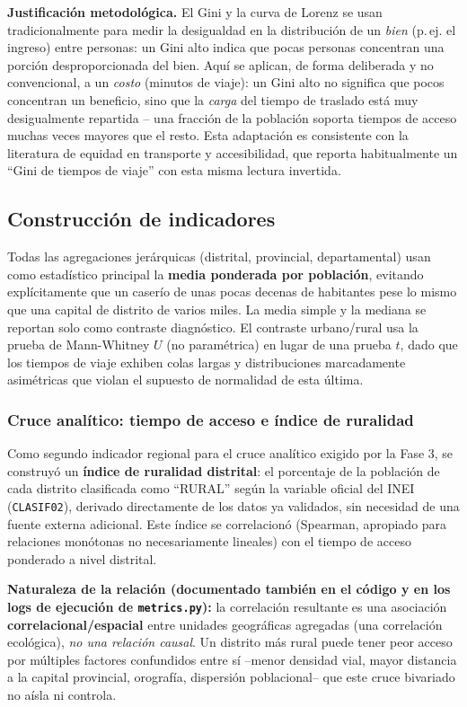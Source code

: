 \documentclass[11pt]{article}
\begin{document}
\textbf{Justificación metodológica.} El Gini y la curva de Lorenz se usan
tradicionalmente para medir la desigualdad en la distribución de un
\emph{bien} (p.\,ej. el ingreso) entre personas: un Gini alto indica que
pocas personas concentran una porción desproporcionada del bien. Aquí se
aplican, de forma deliberada y no convencional, a un \emph{costo} (minutos
de viaje): un Gini alto no significa que pocos concentran un beneficio,
sino que la \emph{carga} del tiempo de traslado está muy desigualmente
repartida -- una fracción de la población soporta tiempos de acceso muchas
veces mayores que el resto. Esta adaptación es consistente con la
literatura de equidad en transporte y accesibilidad, que reporta
habitualmente un ``Gini de tiempos de viaje'' con esta misma lectura
invertida.

\subsection{Construcción de indicadores}

Todas las agregaciones jerárquicas (distrital, provincial, departamental)
usan como estadístico principal la \textbf{media ponderada por
población}, evitando explícitamente que un caserío de unas pocas decenas
de habitantes pese lo mismo que una capital de distrito de varios miles.
La media simple y la mediana se reportan solo como contraste diagnóstico.
El contraste urbano/rural usa la prueba de Mann-Whitney $U$ (no
paramétrica) en lugar de una prueba $t$, dado que los tiempos de viaje
exhiben colas largas y distribuciones marcadamente asimétricas que violan
el supuesto de normalidad de esta última.

\subsubsection{Cruce analítico: tiempo de acceso e índice de ruralidad}

Como segundo indicador regional para el cruce analítico exigido por la
Fase 3, se construyó un \textbf{índice de ruralidad distrital}: el
porcentaje de la población de cada distrito clasificada como ``RURAL''
según la variable oficial del INEI (\texttt{CLASIF02}), derivado
directamente de los datos ya validados, sin necesidad de una fuente
externa adicional. Este índice se correlacionó (Spearman, apropiado para
relaciones monótonas no necesariamente lineales) con el tiempo de acceso
ponderado a nivel distrital.

\textbf{Naturaleza de la relación (documentado también en el código y en
los logs de ejecución de \texttt{metrics.py}):} la correlación resultante
es una asociación \textbf{correlacional/espacial} entre unidades
geográficas agregadas (una correlación ecológica), \emph{no una relación
causal}. Un distrito más rural puede tener peor acceso por múltiples
factores confundidos entre sí --menor densidad vial, mayor distancia a la
capital provincial, orografía, dispersión poblacional-- que este cruce
bivariado no aísla ni controla.
\end{document}
